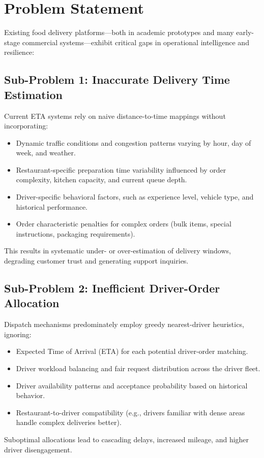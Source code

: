\documentclass[12pt,a4paper]{report}
\begin{document}
\section{Problem Statement}

Existing food delivery platforms---both in academic prototypes and many early-stage commercial systems---exhibit critical gaps in operational intelligence and resilience:

\subsection{Sub-Problem 1: Inaccurate Delivery Time Estimation}
Current ETA systems rely on naive distance-to-time mappings without incorporating:
\begin{itemize}
    \item Dynamic traffic conditions and congestion patterns varying by hour, day of week, and weather.
    \item Restaurant-specific preparation time variability influenced by order complexity, kitchen capacity, and current queue depth.
    \item Driver-specific behavioral factors, such as experience level, vehicle type, and historical performance.
    \item Order characteristic penalties for complex orders (bulk items, special instructions, packaging requirements).
\end{itemize}
This results in systematic under- or over-estimation of delivery windows, degrading customer trust and generating support inquiries.

\subsection{Sub-Problem 2: Inefficient Driver-Order Allocation}
Dispatch mechanisms predominately employ greedy nearest-driver heuristics, ignoring:
\begin{itemize}
    \item Expected Time of Arrival (ETA) for each potential driver-order matching.
    \item Driver workload balancing and fair request distribution across the driver fleet.
    \item Driver availability patterns and acceptance probability based on historical behavior.
    \item Restaurant-to-driver compatibility (e.g., drivers familiar with dense areas handle complex deliveries better).
\end{itemize}
Suboptimal allocations lead to cascading delays, increased mileage, and higher driver disengagement.
\end{document}
